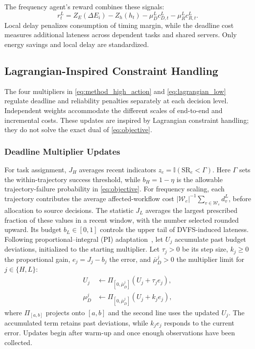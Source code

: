 \documentclass[journal]{IEEEtran}
\newcommand{\ind}{\mathbb{I}}
\begin{document}
The frequency agent's reward combines these signals:
\begin{equation}
    r_t^L=Z_E(\Delta E_i)-Z_h(h_t)
        -\mu_D^L c_{D,t}^L-\mu_R^L c_{R,t}^L.
    \label{eq:lagrangian_low}
\end{equation}
Local delay penalizes consumption of timing margin, while the deadline cost measures additional lateness across dependent tasks and shared servers. Only energy savings and local delay are standardized.

\subsection{Lagrangian-Inspired Constraint Handling}
\label{subsec:lagrangian}
The four multipliers in \eqref{eq:method_high_action} and \eqref{eq:lagrangian_low} regulate deadline and reliability penalties separately at each decision level. Independent weights accommodate the different scales of end-to-end and incremental costs. These updates are inspired by Lagrangian constraint handling; they do not solve the exact dual of \eqref{eq:objective}.
\subsubsection{Deadline Multiplier Updates}
For task assignment, $J_H$ averages recent indicators $z_e=\ind(\mathrm{SR}_e<\Gamma)$. Here $\Gamma$ sets the within-trajectory success threshold, while $b_H=1-\eta$ is the allowable trajectory-failure probability in \eqref{eq:objective}. For frequency scaling, each trajectory contributes the average affected-workflow cost $|\mathcal W_e|^{-1}\sum_{v\in\mathcal W_e}d_v^L$, before allocation to source decisions. The statistic $J_L$ averages the largest prescribed fraction of these values in a recent window, with the number selected rounded upward. Its budget $b_L\in[0,1]$ controls the upper tail of DVFS-induced lateness. Following proportional--integral (PI) adaptation~\cite{stooke2020}, let $U_j$ accumulate past budget deviations, initialized to the starting multiplier. Let $\tau_j>0$ be its step size, $k_j\geq0$ the proportional gain, $e_j=J_j-b_j$ the error, and $\bar\mu_D^j>0$ the multiplier limit for $j\in\{H,L\}$:
\begin{equation*}
\begin{aligned}
    U_j&\leftarrow
        \Pi_{[0,\bar\mu_D^j]}(U_j+\tau_j e_j),\\
    \mu_D^j&\leftarrow
        \Pi_{[0,\bar\mu_D^j]}(U_j+k_j e_j),
\end{aligned}
\end{equation*}
where $\Pi_{[a,b]}$ projects onto $[a,b]$ and the second line uses the updated $U_j$. The accumulated term retains past deviations, while $k_j e_j$ responds to the current error. Updates begin after warm-up and once enough observations have been collected.
\end{document}
